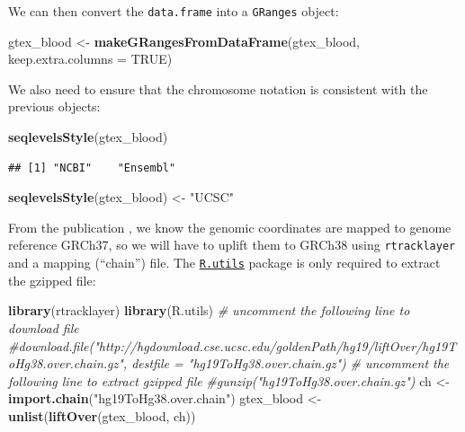 \documentclass[9pt,a4paper,]{extarticle}
\newenvironment{Shaded}{\begin{snugshade}}{\end{snugshade}}
\newcommand{\KeywordTok}[1]{\textcolor[rgb]{0.13,0.29,0.53}{\textbf{#1}}}
\newcommand{\DataTypeTok}[1]{\textcolor[rgb]{0.13,0.29,0.53}{#1}}
\newcommand{\StringTok}[1]{\textcolor[rgb]{0.31,0.60,0.02}{#1}}
\newcommand{\CommentTok}[1]{\textcolor[rgb]{0.56,0.35,0.01}{\textit{#1}}}
\newcommand{\OtherTok}[1]{\textcolor[rgb]{0.56,0.35,0.01}{#1}}
\newcommand{\NormalTok}[1]{#1}
\theoremstyle{definition}
\theoremstyle{definition}
\theoremstyle{definition}
\theoremstyle{remark}
\begin{document}
We can then convert the \texttt{data.frame} into a \texttt{GRanges} object:

\begin{Shaded}
\begin{Highlighting}[]
\NormalTok{gtex_blood <-}\StringTok{ }\KeywordTok{makeGRangesFromDataFrame}\NormalTok{(gtex_blood, }\DataTypeTok{keep.extra.columns =} \OtherTok{TRUE}\NormalTok{)}
\end{Highlighting}
\end{Shaded}

We also need to ensure that the chromosome notation is consistent with the previous objects:

\begin{Shaded}
\begin{Highlighting}[]
\KeywordTok{seqlevelsStyle}\NormalTok{(gtex_blood)}
\end{Highlighting}
\end{Shaded}

\begin{verbatim}
## [1] "NCBI"    "Ensembl"
\end{verbatim}

\begin{Shaded}
\begin{Highlighting}[]
\KeywordTok{seqlevelsStyle}\NormalTok{(gtex_blood) <-}\StringTok{ "UCSC"}
\end{Highlighting}
\end{Shaded}

From the publication \citep{GTEx2017}, we know the genomic coordinates are mapped to genome reference GRCh37, so we will have to uplift them to GRCh38 using \texttt{rtracklayer} \citep{Lawrence2009} and a mapping (``chain'') file.
The \href{https://cran.r-project.org/package=R.utils}{\texttt{R.utils}} package is only required to extract the gzipped file:

\begin{Shaded}
\begin{Highlighting}[]
\KeywordTok{library}\NormalTok{(rtracklayer)}
\KeywordTok{library}\NormalTok{(R.utils)}
\CommentTok{# uncomment the following line to download file}
\CommentTok{#download.file("http://hgdownload.cse.ucsc.edu/goldenPath/hg19/liftOver/hg19ToHg38.over.chain.gz", destfile = "hg19ToHg38.over.chain.gz")}
\CommentTok{# uncomment the following line to extract gzipped file}
\CommentTok{#gunzip("hg19ToHg38.over.chain.gz")}
\NormalTok{ch <-}\StringTok{ }\KeywordTok{import.chain}\NormalTok{(}\StringTok{"hg19ToHg38.over.chain"}\NormalTok{)}
\NormalTok{gtex_blood <-}\StringTok{ }\KeywordTok{unlist}\NormalTok{(}\KeywordTok{liftOver}\NormalTok{(gtex_blood, ch))}
\end{Highlighting}
\end{Shaded}
\end{document}
